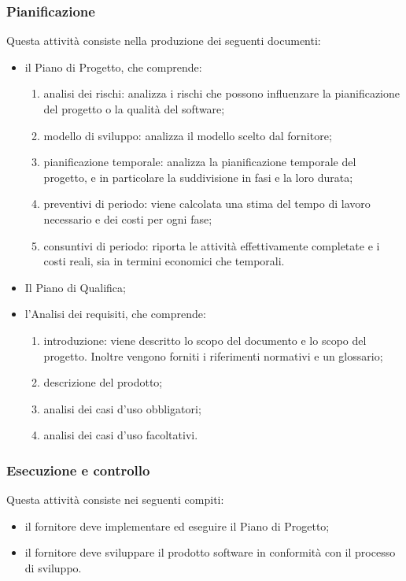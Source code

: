     \subsubsection{Pianificazione}\label{sec:pianificazione}
        Questa attività consiste nella produzione dei seguenti documenti:
        \begin{itemize}
            \item il Piano di Progetto, che comprende:
            \begin{enumerate}
                \item analisi dei rischi: analizza i rischi che possono influenzare la pianificazione del progetto o la qualità del software;
                \item modello di sviluppo: analizza il modello scelto dal fornitore;
                \item pianificazione temporale: analizza la pianificazione temporale del progetto, e in particolare la suddivisione in fasi e la loro durata;
                \item preventivi di periodo: viene calcolata una stima del tempo di lavoro necessario e dei costi per ogni fase;
                \item consuntivi di periodo: riporta le attività effettivamente completate e i costi reali, sia in termini economici che temporali. 
            \end{enumerate}
            \item Il Piano di Qualifica;
            \item l'Analisi dei requisiti, che comprende:
            \begin{enumerate}
                \item introduzione: viene descritto lo scopo del documento e lo scopo del progetto. Inoltre vengono forniti i riferimenti normativi e un glossario;  
                \item descrizione del prodotto;
                \item analisi dei casi d'uso obbligatori;
                \item analisi dei casi d'uso facoltativi.
            \end{enumerate}
        \end{itemize}

    \subsubsection{Esecuzione e controllo}\label{sec:esecuzione e controllo}
        Questa attività consiste nei seguenti compiti:
        \begin{itemize}
            \item il fornitore deve implementare ed eseguire il Piano di Progetto;
            \item il fornitore deve sviluppare il prodotto software in conformità con il processo di sviluppo.
        \end{itemize}


